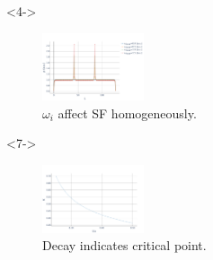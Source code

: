 \documentclass[aspectratio=169]{beamer}
\begin{document}
\begin{frame}
\begin{columns}[onlytextwidth]
    \begin{column}{0.33\textwidth}
      \begin{onlyenv}<4->
        \begin{figure}[ht]
          \centering
          \includegraphics[height=2cm, width=\textwidth,keepaspectratio]{../img/Density-profiles-SF.pdf}
          \caption*{$\omega_i$ affect SF homogeneously.}
        \end{figure}   
      \end{onlyenv}

      \begin{onlyenv}<7->
        \begin{figure}[ht]
          \centering
          \includegraphics[height=2cm, width=\textwidth,keepaspectratio]{../img/Correlations-K-values.pdf}
          \caption*{Decay indicates critical point.}
        \end{figure}   
      \end{onlyenv}
    \end{column}
  \end{columns}
\end{frame}
 
  
\end{document}

